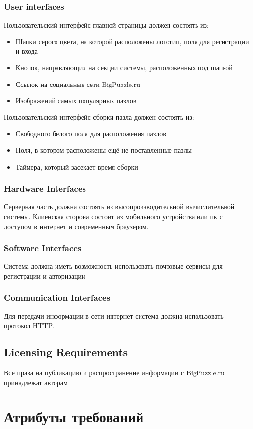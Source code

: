 \documentclass[12pt]{article}
\begin{document}
\subsubsection{User interfaces}
Пользовательский интерфейс главной страницы должен состоять из:
\begin{itemize}[itemsep=0.25ex]
    \item Шапки серого цвета, на которой расположены логотип, поля для регистрации и входа
    \item Кнопок, направляющих на секции системы, расположенных под шапкой
    \item Ссылок на социальные сети BigPuzzle.ru
    \item Изображений самых популярных пазлов
\end{itemize}
Пользовательский интерфейс сборки пазла должен состоять из:
\begin{itemize}[itemsep=0.25ex]
    \item Свободного белого поля для расположения пазлов
    \item Поля, в котором расположены ещё не поставленные пазлы
    \item Таймера, который засекает время сборки
\end{itemize}
\subsubsection{Hardware Interfaces}
Серверная часть должна состоять из высопроизводительной вычислительной системы.
Клиенская сторона состоит из мобильного устройства или пк с доступом в интернет и современным браузером.
\subsubsection{Software Interfaces}
Система должна иметь возможность использовать почтовые сервисы для регистрации и авторизации
\subsubsection{Communication Interfaces}
Для передачи информации в сети интернет система должна использовать протокол HTTP.
\subsection{Licensing Requirements}
Все права на публикацию и распространение информации с BigPuzzle.ru принадлежат авторам

\section{Атрибуты требований}
\end{document}
